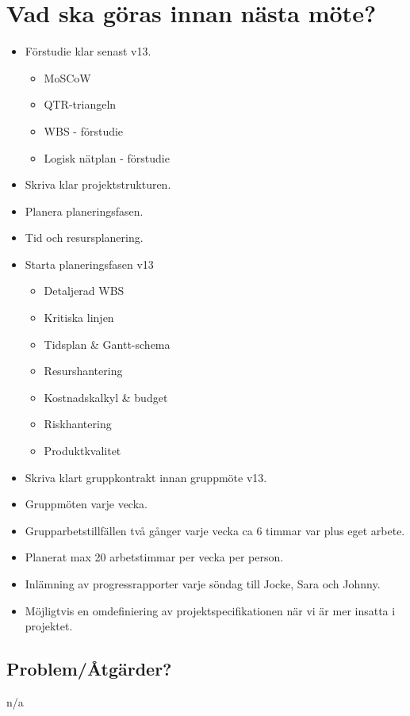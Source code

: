 \section*{Vad ska göras innan nästa möte?}
\begin{itemize}[noitemsep]
    \item Förstudie klar senast v13.
    \begin{itemize}[noitemsep]
        \item MoSCoW
        \item QTR-triangeln
        \item WBS - förstudie
        \item Logisk nätplan - förstudie
    \end{itemize}
    \item Skriva klar projektstrukturen.
    \item Planera planeringsfasen.
    \item Tid och resursplanering.
    \item Starta planeringsfasen v13
    \begin{itemize}[noitemsep]
        \item Detaljerad WBS
        \item Kritiska linjen
        \item Tidsplan \& Gantt-schema
        \item Resurshantering
        \item Kostnadskalkyl \& budget
        \item Riskhantering
        \item Produktkvalitet
    \end{itemize}
    \item Skriva klart gruppkontrakt innan gruppmöte v13.
    \item Gruppmöten varje vecka.
    \item Grupparbetstillfällen två gånger varje vecka ca 6 timmar var plus eget arbete.
    \item Planerat max 20 arbetstimmar per vecka per person.
    \item Inlämning av progressrapporter varje söndag till Jocke, Sara och Johnny.
    \item Möjligtvis en omdefiniering av projektspecifikationen när vi är mer insatta i projektet.
\end{itemize}

\subsection*{Problem/Åtgärder?}
n/a

